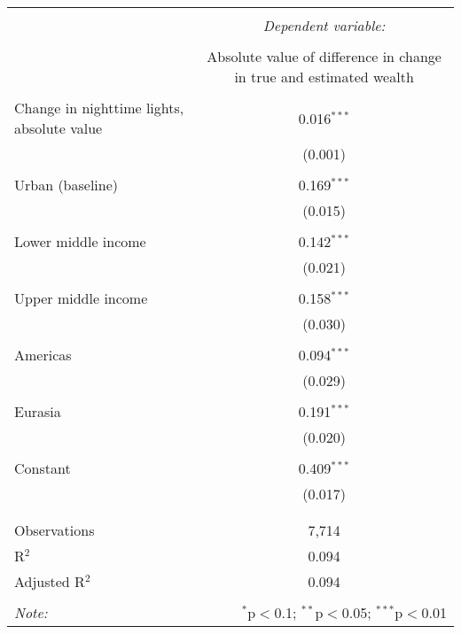 
\begin{tabular}{@{\extracolsep{5pt}}lc} 
\\[-1.8ex]\hline 
\hline \\[-1.8ex] 
 & \multicolumn{1}{c}{\textit{Dependent variable:}} \\ 
\cline{2-2} 
\\[-1.8ex] & Absolute value of difference in change in true and estimated wealth \\ 
\hline \\[-1.8ex] 
 Change in nighttime lights, absolute value & 0.016$^{***}$ \\ 
  & (0.001) \\ 
  & \\ 
 Urban (baseline) & 0.169$^{***}$ \\ 
  & (0.015) \\ 
  & \\ 
 Lower middle income & 0.142$^{***}$ \\ 
  & (0.021) \\ 
  & \\ 
 Upper middle income & 0.158$^{***}$ \\ 
  & (0.030) \\ 
  & \\ 
 Americas & 0.094$^{***}$ \\ 
  & (0.029) \\ 
  & \\ 
 Eurasia & 0.191$^{***}$ \\ 
  & (0.020) \\ 
  & \\ 
 Constant & 0.409$^{***}$ \\ 
  & (0.017) \\ 
  & \\ 
\hline \\[-1.8ex] 
Observations & 7,714 \\ 
R$^{2}$ & 0.094 \\ 
Adjusted R$^{2}$ & 0.094 \\ 
\hline 
\hline \\[-1.8ex] 
\textit{Note:}  & \multicolumn{1}{r}{$^{*}$p$<$0.1; $^{**}$p$<$0.05; $^{***}$p$<$0.01} \\ 
\end{tabular} 
